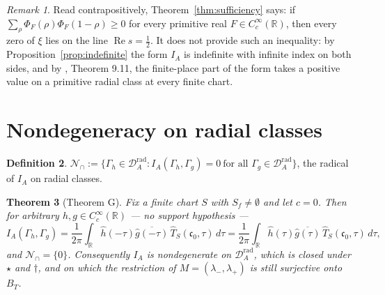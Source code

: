 \documentclass[11pt]{amsart}
\newtheorem{theorem}{Theorem}[section]
\theoremstyle{definition}
\newtheorem{definition}[theorem]{Definition}
\theoremstyle{remark}
\newtheorem{remark}[theorem]{Remark}
\newcommand{\R}{\mathbb R}
\newcommand{\Rel}{\operatorname{Re}}
\newcommand{\DAr}{\mathcal D_A^{\mathrm{rad}}}
\newcommand{\cz}{\mathfrak c_0}
\newcommand{\BT}{B_T}
\begin{document}
\begin{remark}
\label{rem:sufficiency}
Read contrapositively, Theorem~\ref{thm:sufficiency} says: if
$\sum_\rho\Phi_F(\rho)\Phi_F(1-\rho)\ge0$ for every primitive real
$F\in C_c^\infty(\R)$, then every zero of $\xi$ lies on the line
$\Rel s=\tfrac12$.  It does not provide such an inequality: by
Proposition~\ref{prop:indefinite} the form $I_A$ is indefinite with infinite
index on both sides, and by \cite{P44}, Theorem 9.11, the finite-place part of
the form takes a positive value on a primitive radial class at every finite
chart.
\end{remark}

\section{Nondegeneracy on radial classes}
\label{sec:radicalsec}

\begin{definition}
\label{def:radsec}
$\mathcal N_\cap:=\{\Gamma_h\in\DAr: I_A(\Gamma_h,\Gamma_g)=0\ \text{for all }
\Gamma_g\in\DAr\}$, the radical of $I_A$ on radial classes.
\end{definition}

\begin{theorem}[Theorem G]
\label{thm:radical}
Fix a finite chart $S$ with $S_f\ne\emptyset$ and let $c=0$.  Then for
arbitrary $h,g\in C_c^\infty(\R)$ --- no support hypothesis ---
\begin{equation}
  I_A(\Gamma_h,\Gamma_g)
  =\frac1{2\pi}\int_\R\hat h(-\tau)\overline{\hat g(-\tau)}\,
     \widehat T_S(\cz,\tau)\,d\tau
  =\frac1{2\pi}\int_\R\hat h(\tau)\overline{\hat g(\tau)}\,
     \widehat T_S(\cz,\tau)\,d\tau ,
\tag{12.1}
\end{equation}
and $\mathcal N_\cap=\{0\}$.  Consequently $I_A$ is nondegenerate on $\DAr$,
which is closed under $\star$ and $\dagger$, and on which the restriction of
$M=(\lambda_-,\lambda_+)$ is still surjective onto $\BT$.
\end{theorem}
\end{document}
